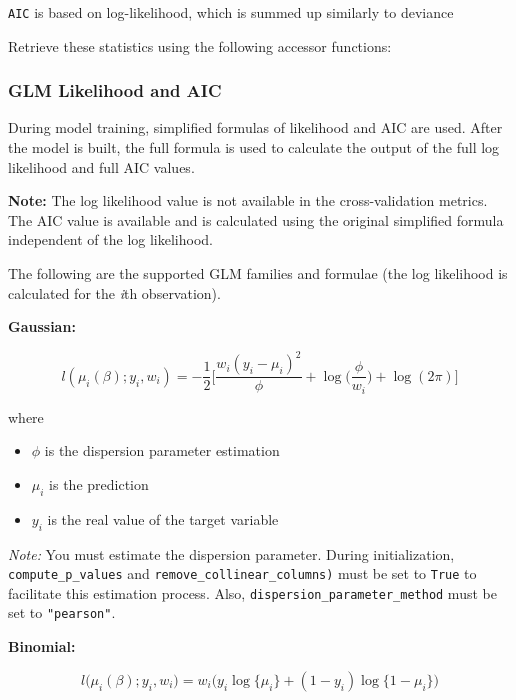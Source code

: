 \texttt{AIC} is based on log-likelihood, which is summed up similarly to deviance

Retrieve these statistics using the following accessor functions:

\waterExampleInR


\waterExampleInPython


\subsubsection{GLM Likelihood and AIC}

During model training, simplified formulas of likelihood and AIC are used. After the model is built, the full formula is used to calculate the output of the full log likelihood and full AIC values.

\textbf{Note:} The log likelihood value is not available in the cross-validation metrics. The AIC value is available and is calculated using the original simplified formula independent of the log likelihood.

The following are the supported GLM families and formulae (the log likelihood is calculated for the  \emph{i}th observation).

\textbf{Gaussian:}

$$l(\mu_i (\beta); y_i, w_i) = - \frac{1}{2} \Big[ \frac{w_i (y_i - \mu_i)^2}{\phi} + \log \big(\frac{\phi}{w_i} \big) + \log (2 \pi) \Big]$$

where

\begin{itemize}
\item $\phi$ is the dispersion parameter estimation
\item $\mu_i$ is the prediction
\item $y_i$ is the real value of the target variable
\end{itemize}

\emph{Note:} You must estimate the dispersion parameter. During initialization, \texttt{compute\_p\_values} and \texttt{remove\_collinear\_columns)} must be set to \texttt{True} to facilitate this estimation process. Also, \texttt{dispersion\_parameter\_method} must be set to \texttt{"pearson"}.

\textbf{Binomial:}

$$l \big(\mu_i (\beta); y_i, w_i \big) = w_i \big(y_i \log \{ \mu_i \} + (1-y_i) \log \{ 1-\mu_i \} \big)$$

